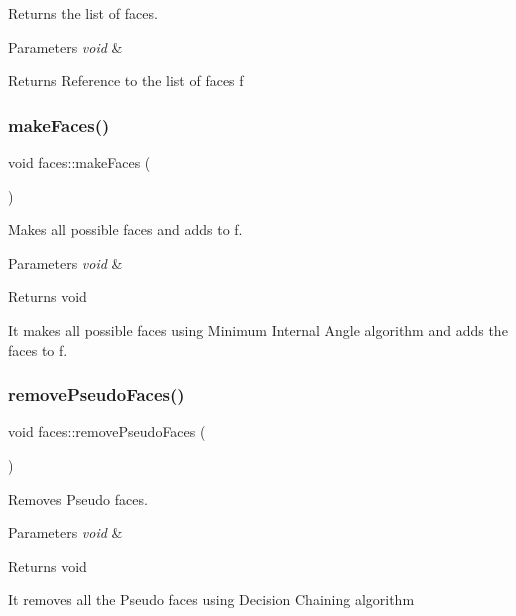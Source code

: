Returns the list of faces. 


\begin{DoxyParams}{Parameters}
{\em void} & \\
\hline
\end{DoxyParams}
\begin{DoxyReturn}{Returns}
Reference to the list of faces f 
\end{DoxyReturn}
\mbox{\label{classfaces_a71751dbb77129bd08594b2d3d563a7fd}} 
\subsubsection{\texorpdfstring{make\+Faces()}{makeFaces()}}
{\footnotesize\ttfamily void faces\+::make\+Faces (\begin{DoxyParamCaption}{ }\end{DoxyParamCaption})}



Makes all possible faces and adds to f. 


\begin{DoxyParams}{Parameters}
{\em void} & \\
\hline
\end{DoxyParams}
\begin{DoxyReturn}{Returns}
void
\end{DoxyReturn}
It makes all possible faces using Minimum Internal Angle algorithm and adds the faces to f. \mbox{\label{classfaces_a40dea4a75ea92a062b5a3fab8246269b}} 
\subsubsection{\texorpdfstring{remove\+Pseudo\+Faces()}{removePseudoFaces()}}
{\footnotesize\ttfamily void faces\+::remove\+Pseudo\+Faces (\begin{DoxyParamCaption}{ }\end{DoxyParamCaption})}



Removes Pseudo faces. 


\begin{DoxyParams}{Parameters}
{\em void} & \\
\hline
\end{DoxyParams}
\begin{DoxyReturn}{Returns}
void
\end{DoxyReturn}
It removes all the Pseudo faces using Decision Chaining algorithm 

